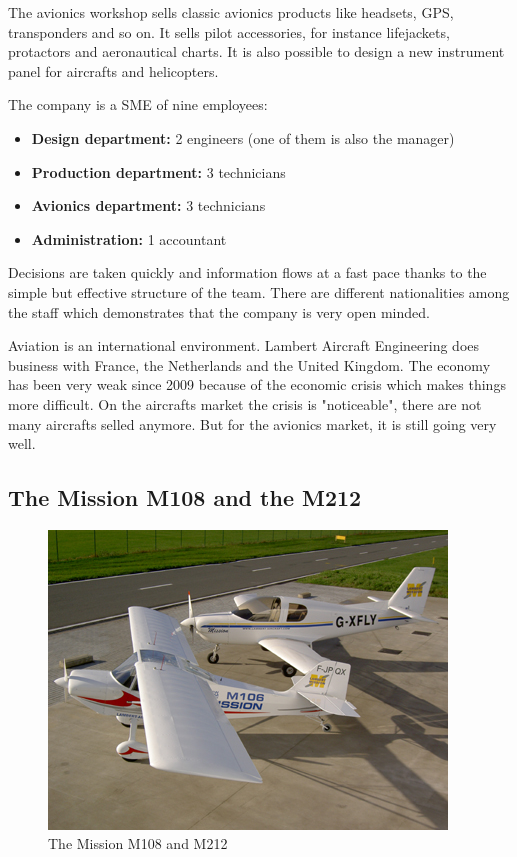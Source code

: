 \documentclass[11pt,a4paper]{article}
\begin{document}
\bigskip

The avionics workshop sells classic avionics products like headsets, GPS, transponders and so on. It sells pilot accessories, for instance lifejackets, protactors and aeronautical charts. It is also possible to design a new instrument panel for aircrafts and helicopters.

\bigskip

The company is a SME of nine employees:
\begin{itemize}
\setlength{\itemsep}{0pt}
\item \textbf{Design department:} 2 engineers (one of them is also the manager)
\item \textbf{Production department:} 3 technicians
\item \textbf{Avionics department:} 3 technicians
\item \textbf{Administration:} 1 accountant
\end{itemize}

Decisions are taken quickly and information flows at a fast pace thanks to the simple but effective structure of the team.  There are different nationalities among the staff which demonstrates that the company is very open minded.

\bigskip

Aviation is an international environment. Lambert Aircraft Engineering does business with France, the Netherlands and the United Kingdom. The economy has been very weak since 2009 because of the economic crisis which makes things more difficult. On the aircrafts market the crisis is "noticeable", there are not many aircrafts selled anymore. But for the avionics market, it is still going very well.

\newpage

\subsection{The Mission M108 and the M212}
\begin{figure}[ht!]
	\begin{center}
		\includegraphics[trim = 0cm 1cm 0cm 1cm,clip]{pics/PIC003.jpg}
		\caption{The Mission M108 and M212}
		\label{fig:PIC003}
	\end{center}
\end{figure}
\end{document}

